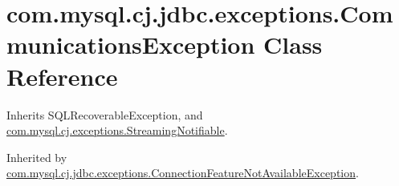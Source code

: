 \hypertarget{classcom_1_1mysql_1_1cj_1_1jdbc_1_1exceptions_1_1_communications_exception}{}\section{com.\+mysql.\+cj.\+jdbc.\+exceptions.\+Communications\+Exception Class Reference}
\label{classcom_1_1mysql_1_1cj_1_1jdbc_1_1exceptions_1_1_communications_exception}


Inherits S\+Q\+L\+Recoverable\+Exception, and \mbox{\hyperlink{interfacecom_1_1mysql_1_1cj_1_1exceptions_1_1_streaming_notifiable}{com.\+mysql.\+cj.\+exceptions.\+Streaming\+Notifiable}}.



Inherited by \mbox{\hyperlink{classcom_1_1mysql_1_1cj_1_1jdbc_1_1exceptions_1_1_connection_feature_not_available_exception}{com.\+mysql.\+cj.\+jdbc.\+exceptions.\+Connection\+Feature\+Not\+Available\+Exception}}.

